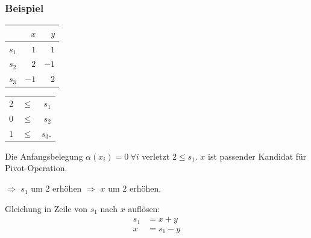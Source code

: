 \documentclass[hyperref={pdfpagelabels=false}]{beamer}
\begin{document}
\begin{frame}
	\frametitle{Beispiel}
	\begin{center}
		\begin{tabular}{r|rr}
			& $x$ & $y$ \\ \hline
			$s_1$ & $1$ & $1$ \\
			$s_2$ & $2$ & $-1$ \\
			$s_3$ & $-1$ & $2$
		\end{tabular}
		\qquad
		\begin{tabular}{rrr}
			$2$ & $\leq$ & $s_1$ \\
			$0$ & $\leq$ & $s_2$ \\
			$1$ & $\leq$ & $s_3$.
		\end{tabular}
	\end{center}
	Die Anfangsbelegung $\alpha(x_i) = 0\ \forall i$ verletzt $2 \leq s_1$. $x$ ist passender Kandidat für Pivot-Operation.

	$\Rightarrow$ $s_1$ um $2$ erhöhen $\Rightarrow$ $x$ um $2$ erhöhen.

	Gleichung in Zeile von $s_1$ nach $x$ auflösen:
	\begin{align*}
		s_1 &= x + y \\
		x & = s_1 - y
	\end{align*}
\end{frame}
\end{document}
